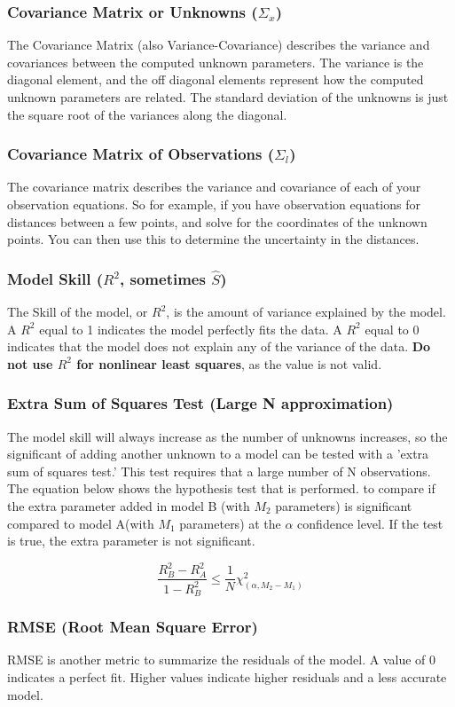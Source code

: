 \subsubsection*{Covariance Matrix or Unknowns ($\Sigma_x$) }
The Covariance Matrix (also Variance-Covariance) describes the variance and covariances between the computed unknown parameters.  The variance is the diagonal element, and the off diagonal elements represent how the computed unknown parameters are related.  The standard deviation of the unknowns is just the square root of the variances along the diagonal.  

\subsubsection*{Covariance Matrix of Observations ($\Sigma_l$)}
The covariance matrix describes the variance and covariance of each of your observation equations.  So for example, if you have observation equations for distances between a few points, and solve for the coordinates of the unknown points.  You can then use this to determine the uncertainty in the distances.  


\subsubsection*{Model Skill ($R^2$, sometimes $\hat{S}$)}
The Skill of the model, or $R^2$, is the amount of variance explained by the model.  A $R^2$ equal to 1 indicates the model perfectly fits the data.  A $R^2$ equal to 0 indicates that the model does not explain any of the variance of the data.  \textbf{Do not use $R^2$ for nonlinear least squares}, as the value is not valid.  

\subsubsection*{Extra Sum of Squares Test (Large N approximation)}
The model skill will always increase as the number of unknowns increases, so the significant of adding another unknown to a model can be tested with a 'extra sum of squares test.'  This test requires that a large number of N observations.  The equation below shows the hypothesis test that is performed. to compare if the extra parameter added in model B (with $M_2$ parameters) is significant compared to model A(with $M_1$ parameters) at the $\alpha$ confidence level.  If the test is true, the extra parameter is not significant.

\[
\dfrac{R_B^2 - R_A^2}{1 - R_B^2} \leq \dfrac{1}{N}\chi_{(\alpha,M_2-M_1)}^2
\]

\subsubsection*{RMSE (Root Mean Square Error)}
RMSE is another metric to summarize the residuals of the model.  A value of 0 indicates a perfect fit.  Higher values indicate higher residuals and a less accurate model.